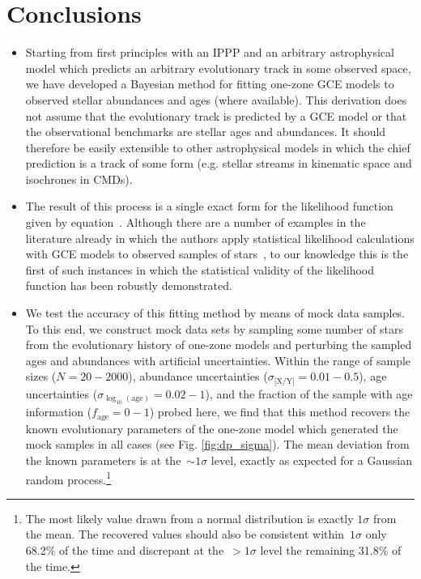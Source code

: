 \documentclass[ms.tex]{subfiles}
\begin{document}
\section{Conclusions}
\label{sec:conclusions}

\begin{itemize}

	\item Starting from first principles with an IPPP and an arbitrary
	astrophysical model which predicts an arbitrary evolutionary track in some
	observed space, we have developed a Bayesian method for fitting one-zone
	GCE models to observed stellar abundances and ages (where available).
	This derivation does not assume that the evolutionary track is predicted by
	a GCE model or that the observational benchmarks are stellar ages and
	abundances.
	It should therefore be easily extensible to other astrophysical models in
	which the chief prediction is a track of some form (e.g. stellar streams
	in kinematic space and isochrones in CMDs).
	
	\item The result of this process is a single exact form for the likelihood
	function given by equation~.
	Although there are a number of examples in the literature already in which
	the authors apply statistical likelihood calculations with GCE models to
	observed samples of stars~\citep[e.g.][]{Spitoni2020, Spitoni2021,
	Hasselquist2021}, to our knowledge this is the first of such instances in
	which the statistical validity of the likelihood function has been robustly
	demonstrated.

	\item We test the accuracy of this fitting method by means of mock data
	samples.
	To this end, we construct mock data sets by sampling some number of stars
	from the evolutionary history of one-zone models and perturbing the sampled
	ages and abundances with artificial uncertainties.
	Within the range of sample sizes ($N = 20 - 2000$), abundance uncertainties
	($\sigma_\text{[X/Y]} = 0.01 - 0.5$), age uncertainties
	($\sigma_{\log_{10}(\text{age})} = 0.02 - 1$), and the fraction of the
	sample with age information ($f_\text{age} = 0 - 1$) probed here, we find
	that this method recovers the known evolutionary parameters of the one-zone
	model which generated the mock samples in all cases (see Fig.
	\ref{fig:dp_sigma}).
	The mean deviation from the known parameters is at the~$\sim1\sigma$ level,
	exactly as expected for a Gaussian random process.\footnote{
		The most likely value drawn from a normal distribution is exactly
		$1\sigma$ from the mean.
		The recovered values should also be consistent within~$1\sigma$ only
		68.2\% of the time and discrepant at the~$>1\sigma$ level the remaining
		31.8\% of the time.
	}


\end{itemize}
\end{document}
